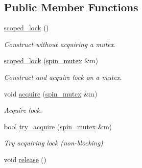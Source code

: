 \subsection*{Public Member Functions}
\begin{DoxyCompactItemize}
\item 
\hypertarget{classtbb_1_1spin__mutex_1_1scoped__lock_a4287be975cf2448c95f068b065c45107}{}\hyperlink{classtbb_1_1spin__mutex_1_1scoped__lock_a4287be975cf2448c95f068b065c45107}{scoped\+\_\+lock} ()\label{classtbb_1_1spin__mutex_1_1scoped__lock_a4287be975cf2448c95f068b065c45107}

\begin{DoxyCompactList}\small\item\em Construct without acquiring a mutex. \end{DoxyCompactList}\item 
\hypertarget{classtbb_1_1spin__mutex_1_1scoped__lock_a73f7381a9a112b9f5a856b1face525fb}{}\hyperlink{classtbb_1_1spin__mutex_1_1scoped__lock_a73f7381a9a112b9f5a856b1face525fb}{scoped\+\_\+lock} (\hyperlink{classtbb_1_1spin__mutex}{spin\+\_\+mutex} \&m)\label{classtbb_1_1spin__mutex_1_1scoped__lock_a73f7381a9a112b9f5a856b1face525fb}

\begin{DoxyCompactList}\small\item\em Construct and acquire lock on a mutex. \end{DoxyCompactList}\item 
\hypertarget{classtbb_1_1spin__mutex_1_1scoped__lock_a7c702117f08ae82d034a98b3d5510ffc}{}void \hyperlink{classtbb_1_1spin__mutex_1_1scoped__lock_a7c702117f08ae82d034a98b3d5510ffc}{acquire} (\hyperlink{classtbb_1_1spin__mutex}{spin\+\_\+mutex} \&m)\label{classtbb_1_1spin__mutex_1_1scoped__lock_a7c702117f08ae82d034a98b3d5510ffc}

\begin{DoxyCompactList}\small\item\em Acquire lock. \end{DoxyCompactList}\item 
bool \hyperlink{classtbb_1_1spin__mutex_1_1scoped__lock_a76acbd67c74906f6ea33a1de6fd443ce}{try\+\_\+acquire} (\hyperlink{classtbb_1_1spin__mutex}{spin\+\_\+mutex} \&m)
\begin{DoxyCompactList}\small\item\em Try acquiring lock (non-\/blocking) \end{DoxyCompactList}\item 
\hypertarget{classtbb_1_1spin__mutex_1_1scoped__lock_a7e801b0c28fd8395fec400b96acc5c34}{}void \hyperlink{classtbb_1_1spin__mutex_1_1scoped__lock_a7e801b0c28fd8395fec400b96acc5c34}{release} ()\label{classtbb_1_1spin__mutex_1_1scoped__lock_a7e801b0c28fd8395fec400b96acc5c34}


\end{DoxyCompactItemize}
